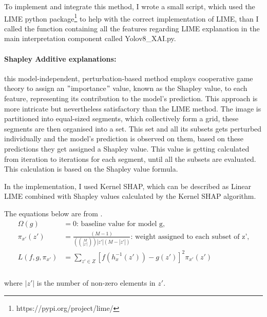 To implement and integrate this method, I wrote a small script, which used the LIME python package\footnote{https://pypi.org/project/lime/} to help with the correct implementation of LIME, than I called the function containing all the features regarding LIME explanation in the main interpretation component called Yolov8\_XAI.py.

\paragraph{Shapley Additive explanations:}\label{par:shap}

this model-independent, perturbation-based method employs cooperative game theory to assign an \("\)importance\("\) value,
known as the Shapley value, to each feature, representing its contribution to the model's prediction.
This approach is more intricate but nevertheless satisfactory than the LIME method.
The image is partitioned into equal-sized segments, which collectively form a grid, these segments are then organised into a set.
This set and all its subsets gets perturbed individually and the model's prediction is observed on them, based on these predictions
they get assigned a Shapley value.
This value is getting calculated from iteration to iterations for each segment, until all the subsets are evaluated.
This calculation is based on the Shapley value formula.

In the implementation, I used Kernel SHAP, which can be described as Linear LIME combined with Shapley values calculated by the Kernel SHAP algorithm.

\begin{theorem}
\end{theorem}
\label{corr:shap_kernel}
The equations below are from \cite{lundberg2017unifiedapproachinterpretingmodel}.
\begin{equation}
\begin{split}
\Omega(g) &= 0 \text{: baseline value for model g,}\\
\pi_{x'}(z') &= \frac{(M-1)}{(\binom{M}{|z'|}) |z'| (M - |z'|)}\text{: weight assigned to each subset of z',} \\
L(f,g,\pi_{x'}) &= \sum_{z' \in Z} \left[ f(h_x^{-1}(z')) - g(z') \right]^2 \pi_{x'}(z') \\
\label{eq:kernel}
\end{split}
\end{equation}
\vspace{-0.4cm} \\where $|z'|$ is the number of non-zero elements in $z'$.

